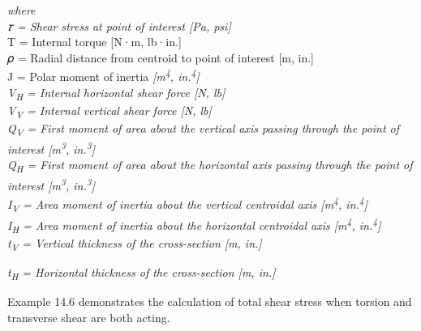 \documentclass[
  letterpaper,
  DIV=11,
  numbers=noendperiod]{scrreprt}
\theoremstyle{definition}
\theoremstyle{remark}
\begin{document}
\emph{where}\\
\emph{𝜏 = Shear stress at point of interest {[}Pa, psi{]}}\\
T = Internal torque {[}N·m, lb·in.{]}\\
𝜌 = Radial distance from centroid to point of interest {[}m, in.{]}\\
J = Polar moment of inertia \emph{{[}m\textsuperscript{4},
in.\textsuperscript{4}{]}}\\
\emph{V\textsubscript{H} = Internal horizontal shear force {[}N,
lb{]}}\\
\emph{V\textsubscript{V} = Internal vertical shear force {[}N, lb{]}}\\
\emph{Q\textsubscript{V} = First moment of area about the vertical axis
passing through the point of interest {[}m\textsuperscript{3},
in.\textsuperscript{3}{]}}\\
\emph{Q\textsubscript{H} = First moment of area about the horizontal
axis passing through the point of interest {[}m\textsuperscript{3},
in.\textsuperscript{3}{]}}\\
\emph{I\textsubscript{V} = Area moment of inertia about the vertical
centroidal axis {[}m\textsuperscript{4}, in.\textsuperscript{4}{]}}\\
\emph{I\textsubscript{H} = Area moment of inertia about the horizontal
centroidal axis {[}m\textsuperscript{4}, in.\textsuperscript{4}{]}}\\
\emph{t\textsubscript{V} = Vertical thickness of the cross-section {[}m,
in.{]}}

\emph{t\textsubscript{H} = Horizontal thickness of the cross-section
{[}m, in.{]}}

Example 14.6 demonstrates the calculation of total shear stress when
torsion and transverse shear are both acting.
\end{document}
